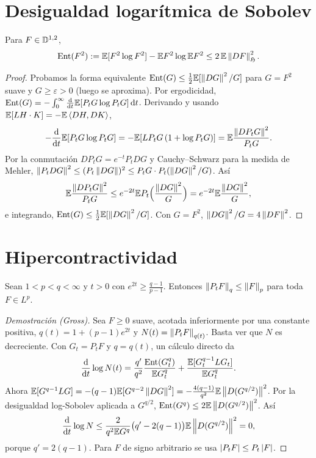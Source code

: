 \section{Desigualdad logarítmica de Sobolev}

\begin{teorema}\label{teo:log-sobolev}
Para $F\in\mathbb{D}^{1,2}$,
\[
  \operatorname{Ent}(F^2):=\mathbb{E}[F^2\log F^2]-\mathbb{E} F^2\log\mathbb{E} F^2\le2\,\mathbb{E}\left\lVert DF\right\rVert^2_{\mathfrak{H}}.
\]
\end{teorema}

\begin{proof}
Probamos la forma equivalente $\operatorname{Ent}(G)\le\frac12\mathbb{E}[\left\lVert DG\right\rVert^2/G]$ para $G=F^2$ suave
y $G\ge\varepsilon>0$ (luego se aproxima). Por ergodicidad, $\operatorname{Ent}(G)=-\int_0^\infty\frac{\mathrm{d}}{\mathrm{d} t}\mathbb{E}[P_tG\log P_tG]\,\mathrm{d} t$.
Derivando y usando $\mathbb{E}[LH\cdot K]=-\mathbb{E}\left\langle DH, DK\right\rangle$,
\[
  -\frac{\mathrm{d}}{\mathrm{d} t}\mathbb{E}[P_tG\log P_tG]=-\mathbb{E}[LP_tG\,(1+\log P_tG)]=\mathbb{E}\frac{\left\lVert DP_tG\right\rVert^2}{P_tG}.
\]
Por la conmutación $DP_tG=e^{-t}P_tDG$ y Cauchy--Schwarz para la medida de Mehler, $\left\lVert P_tDG\right\rVert^2\le
(P_t\left\lVert DG\right\rVert)^2\le P_tG\cdot P_t(\left\lVert DG\right\rVert^2/G)$. Así
\[
  \mathbb{E}\frac{\left\lVert DP_tG\right\rVert^2}{P_tG}\le e^{-2t}\mathbb{E} P_t\Big(\frac{\left\lVert DG\right\rVert^2}{G}\Big)=e^{-2t}\mathbb{E}\frac{\left\lVert DG\right\rVert^2}{G},
\]
e integrando, $\operatorname{Ent}(G)\le\frac12\mathbb{E}[\left\lVert DG\right\rVert^2/G]$. Con $G=F^2$, $\left\lVert DG\right\rVert^2/G=4\left\lVert DF\right\rVert^2$.
\end{proof}

\section{Hipercontractividad}

\begin{teorema}[Nelson]\label{teo:hipercontractividad}
Sean $1<p<q<\infty$ y $t>0$ con $e^{2t}\ge\frac{q-1}{p-1}$. Entonces
$\left\lVert P_tF\right\rVert_q\le\left\lVert F\right\rVert_p$ para toda $F\in L^p$.
\end{teorema}

\begin{proof}[Demostración (Gross)]
Sea $F\ge0$ suave, acotada inferiormente por una constante positiva,
$q(t)=1+(p-1)e^{2t}$ y $N(t)=\left\lVert P_tF\right\rVert_{q(t)}$. Basta ver que $N$ es decreciente. Con $G_t=P_tF$ y
$q=q(t)$, un cálculo directo da
\[
  \frac{\mathrm{d}}{\mathrm{d} t}\log N(t)=\frac{q'}{q^2}\frac{\operatorname{Ent}(G_t^q)}{\mathbb{E} G_t^q}+\frac{\mathbb{E}[G_t^{q-1}LG_t]}{\mathbb{E} G_t^q}.
\]
Ahora $\mathbb{E}[G^{q-1}LG]=-(q-1)\mathbb{E}[G^{q-2}\left\lVert DG\right\rVert^2]=-\frac{4(q-1)}{q^2}\mathbb{E}\left\lVert D(G^{q/2})\right\rVert^2$. Por la desigualdad
log-Sobolev aplicada a $G^{q/2}$, $\operatorname{Ent}(G^q)\le2\mathbb{E}\left\lVert D(G^{q/2})\right\rVert^2$. Así
\[
  \frac{\mathrm{d}}{\mathrm{d} t}\log N\le\frac{2}{q^2\mathbb{E} G^q}\big(q'-2(q-1)\big)\mathbb{E}\left\lVert D(G^{q/2})\right\rVert^2=0,
\]
porque $q'=2(q-1)$. Para $F$ de signo arbitrario se usa $\left\lvert P_tF\right\rvert\le P_t\left\lvert F\right\rvert$.
\end{proof}

